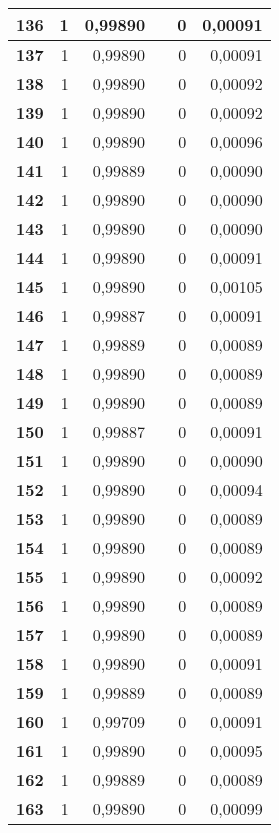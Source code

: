 {\begin{longtable}{|r|r|r|l|r|r|}
\textbf{136} & 1 & 0,99890 &  & 0 & 0,00091 \\ \hline
\textbf{137} & 1 & 0,99890 &  & 0 & 0,00091 \\ \hline
\textbf{138} & 1 & 0,99890 &  & 0 & 0,00092 \\ \hline
\textbf{139} & 1 & 0,99890 &  & 0 & 0,00092 \\ \hline
\textbf{140} & 1 & 0,99890 &  & 0 & 0,00096 \\ \hline
\textbf{141} & 1 & 0,99889 &  & 0 & 0,00090 \\ \hline
\textbf{142} & 1 & 0,99890 &  & 0 & 0,00090 \\ \hline
\textbf{143} & 1 & 0,99890 &  & 0 & 0,00090 \\ \hline
\textbf{144} & 1 & 0,99890 &  & 0 & 0,00091 \\ \hline
\textbf{145} & 1 & 0,99890 &  & 0 & 0,00105 \\ \hline
\textbf{146} & 1 & 0,99887 &  & 0 & 0,00091 \\ \hline
\textbf{147} & 1 & 0,99889 &  & 0 & 0,00089 \\ \hline
\textbf{148} & 1 & 0,99890 &  & 0 & 0,00089 \\ \hline
\textbf{149} & 1 & 0,99890 &  & 0 & 0,00089 \\ \hline
\textbf{150} & 1 & 0,99887 &  & 0 & 0,00091 \\ \hline
\textbf{151} & 1 & 0,99890 &  & 0 & 0,00090 \\ \hline
\textbf{152} & 1 & 0,99890 &  & 0 & 0,00094 \\ \hline
\textbf{153} & 1 & 0,99890 &  & 0 & 0,00089 \\ \hline
\textbf{154} & 1 & 0,99890 &  & 0 & 0,00089 \\ \hline
\textbf{155} & 1 & 0,99890 &  & 0 & 0,00092 \\ \hline
\textbf{156} & 1 & 0,99890 &  & 0 & 0,00089 \\ \hline
\textbf{157} & 1 & 0,99890 &  & 0 & 0,00089 \\ \hline
\textbf{158} & 1 & 0,99890 &  & 0 & 0,00091 \\ \hline
\textbf{159} & 1 & 0,99889 &  & 0 & 0,00089 \\ \hline
\textbf{160} & 1 & 0,99709 &  & 0 & 0,00091 \\ \hline
\textbf{161} & 1 & 0,99890 &  & 0 & 0,00095 \\ \hline
\textbf{162} & 1 & 0,99889 &  & 0 & 0,00089 \\ \hline
\textbf{163} & 1 & 0,99890 &  & 0 & 0,00099 \\ \hline

\end{longtable}}
